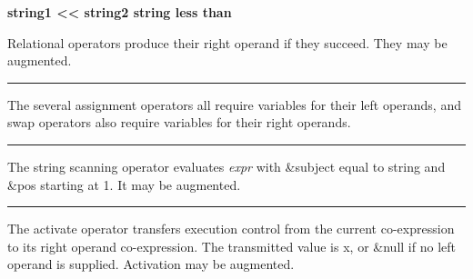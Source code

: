 

\noindent
{\bf string1 {\textless}{\textless} string2 \hfill string less than}






\noindent
Relational operators produce their right operand if they succeed. They
may be augmented.

\bigskip\hrule\vspace{0.1cm}





\noindent The several assignment
operators all require variables for their left operands, and swap
operators also require variables for their right operands.

\bigskip\hrule\vspace{0.1cm}

\noindent
{}The string scanning operator evaluates \textit{expr}
with \textsf{\&subject} equal to string and \textsf{\&pos} starting at
1. It may be augmented.

\bigskip\hrule\vspace{0.1cm}

\noindent The activate operator transfers execution
control from the current co-expression to its right operand
co-expression. The transmitted value is \textsf{x}, or \textsf{\&null}
if no left operand is supplied. Activation may be augmented.

